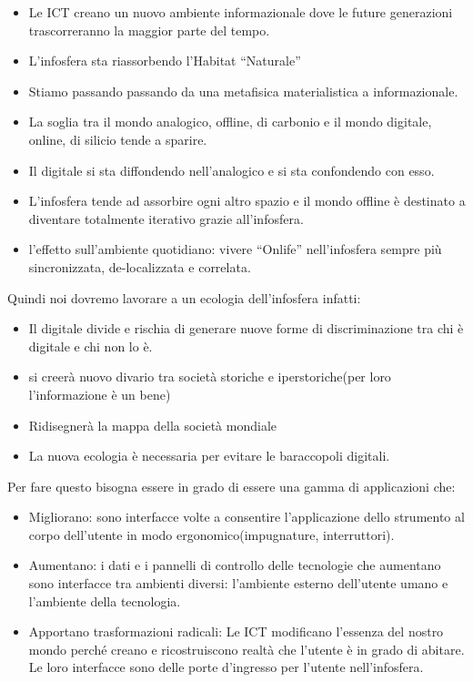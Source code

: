\documentclass[]{article}
\begin{document}
\begin{itemize}
	 
	\item
	Le ICT creano un nuovo ambiente informazionale dove le future
	generazioni trascorreranno la maggior parte del tempo.
	\item
	L'infosfera sta riassorbendo l'Habitat ``Naturale''
	\item
	Stiamo passando passando da una metafisica materialistica a
	informazionale.
	\item
	La soglia tra il mondo analogico, offline, di carbonio e il mondo
	digitale, online, di silicio tende a sparire.
	\item
	Il digitale si sta diffondendo nell'analogico e si sta confondendo con
	esso.
	\item
	L'infosfera tende ad assorbire ogni altro spazio e il mondo offline è
	destinato a diventare totalmente iterativo grazie all'infosfera.
	\item
	l'effetto sull'ambiente quotidiano: vivere ``Onlife'' nell'infosfera
	sempre più sincronizzata, de-localizzata e correlata.
\end{itemize}

Quindi noi dovremo lavorare a un ecologia dell'infosfera infatti:

\begin{itemize}
	 
	\item
	Il digitale divide e rischia di generare nuove forme di
	discriminazione tra chi è digitale e chi non lo è.
	\item
	si creerà nuovo divario tra società storiche e iperstoriche(per loro
	l'informazione è un bene)
	\item
	Ridisegnerà la mappa della società mondiale
	\item
	La nuova ecologia è necessaria per evitare le baraccopoli digitali.
\end{itemize}

Per fare questo bisogna essere in grado di essere una gamma di
applicazioni che:

\begin{itemize}
	 
	\item
	Migliorano: sono interfacce volte a consentire l'applicazione dello
	strumento al corpo dell'utente in modo ergonomico(impugnature,
	interruttori).
	\item
	Aumentano: i dati e i pannelli di controllo delle tecnologie che
	aumentano sono interfacce tra ambienti diversi: l'ambiente esterno
	dell'utente umano e l'ambiente della tecnologia.
	\item
	Apportano trasformazioni radicali: Le ICT modificano l'essenza del
	nostro mondo perché creano e ricostruiscono realtà che l'utente è in
	grado di abitare. Le loro interfacce sono delle porte d'ingresso per
	l'utente nell'infosfera.
\end{itemize}
\end{document}
